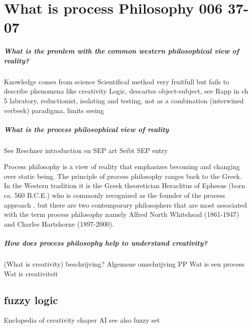 \documentclass[a4paper]{Thesis}
\begin{document}
\chapter{What is process Philosophy 006 37-07}

\paragraph{What is the pronlem with the common western philosophical view of reality?}
	Knowledge comes from science
	Scientifical method very fruitfull but fails to describe phenomena like creativity
		Logic, descartes object-subject, see Rapp in ch 5
		labratory, reductionist, isolating and testing, not as a combination (interwined verbeek)
		paradigma, limits seeing
		
\paragraph{What is the process philosophical view of reality}
See Reschner introduction en SEP art \cite{Rescher-2012-sep}
Seibt SEP entry \cite{Seibt-2013-sep}


Process philosophy is a view of reality that emphasizes becoming and changing over static being. The principle of process philosophy ranges back to the Greek.
In the Western tradition it is the Greek theoretician Heraclitus of Ephesus (born ca. 560 B.C.E.) who is commonly recognized as the founder of the process approach \cite{Seibt-2013-sep}. 
 but there are two contemporary philosophers that are most associated with the term process philosophy namely Alfred North Whitehead (1861-1947) and Charles Hartshorne (1897-2000).



\paragraph{How does process philosophy help to understand creativity?}

\paragragph(What is creativity)
 beschrijving?
Algemene omschrijving PP
Wat is een process
Wat is creativiteit




\section{fuzzy logic}
Enclopedia of creativity chaper AI
see also fuzzy set
\end{document}
